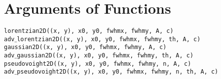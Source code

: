\documentclass[12pt]{article}
\begin{document}
\section*{Arguments of Functions}

\texttt{lorentzian2D((x, y), x0, y0, fwhmx, fwhmy, A, c)} \\
\texttt{adv$\_$lorentzian2D((x, y), x0, y0, fwhmx, fwhmy, th, A, c)} \\
\texttt{gaussian2D((x, y), x0, y0, fwhmx, fwhmy, A, c)} \\
\texttt{adv$\_$gaussian2D((x, y), x0, y0, fwhmx, fwhmy, th, A, c)} \\
\texttt{pseudovoight2D((x, y), x0, y0, fwhmx, fwhmy, n, A, c)} \\
\texttt{adv$\_$pseudovoight2D((x, y), x0, y0, fwhmx, fwhmy, n, th, A, c)} \\
\end{document}
